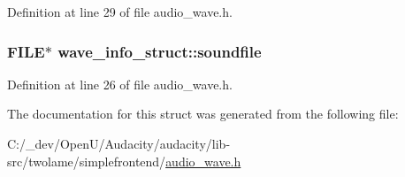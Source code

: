 Definition at line 29 of file audio\+\_\+wave.\+h.

\subsubsection[{\texorpdfstring{soundfile}{soundfile}}]{\setlength{\rightskip}{0pt plus 5cm}F\+I\+LE$\ast$ wave\+\_\+info\+\_\+struct\+::soundfile}\hypertarget{structwave__info__struct_a923e37e26119539af7d973dba3cd9140}{}\label{structwave__info__struct_a923e37e26119539af7d973dba3cd9140}


Definition at line 26 of file audio\+\_\+wave.\+h.



The documentation for this struct was generated from the following file\+:\begin{DoxyCompactItemize}
\item 
C\+:/\+\_\+dev/\+Open\+U/\+Audacity/audacity/lib-\/src/twolame/simplefrontend/\hyperlink{audio__wave_8h}{audio\+\_\+wave.\+h}\end{DoxyCompactItemize}
